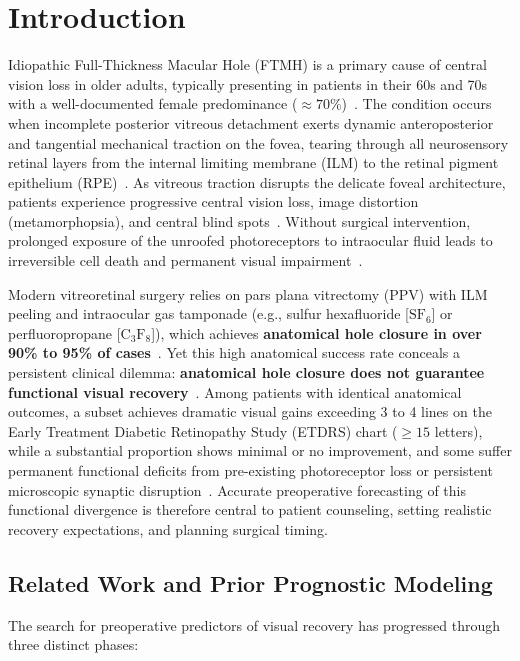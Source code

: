 \documentclass[preprint,12pt]{elsarticle}
\begin{document}
\section{Introduction}

Idiopathic Full-Thickness Macular Hole (FTMH) is a primary cause of central vision loss in older adults, typically presenting in patients in their 60s and 70s with a well-documented female predominance ($\approx 70\%$)~\cite{kelly1991}. The condition occurs when incomplete posterior vitreous detachment exerts dynamic anteroposterior and tangential mechanical traction on the fovea, tearing through all neurosensory retinal layers from the internal limiting membrane (ILM) to the retinal pigment epithelium (RPE)~\cite{gass1995, duker2013, kusuhara2004}. As vitreous traction disrupts the delicate foveal architecture, patients experience progressive central vision loss, image distortion (metamorphopsia), and central blind spots~\cite{michalewska2010}. Without surgical intervention, prolonged exposure of the unroofed photoreceptors to intraocular fluid leads to irreversible cell death and permanent visual impairment~\cite{wakabayashi2010}.

Modern vitreoretinal surgery relies on pars plana vitrectomy (PPV) with ILM peeling and intraocular gas tamponade (e.g., sulfur hexafluoride [$\text{SF}_6$] or perfluoropropane [$\text{C}_3\text{F}_8$]), which achieves \textbf{anatomical hole closure in over 90\% to 95\% of cases}~\cite{kelly1991, brooks2000}. Yet this high anatomical success rate conceals a persistent clinical dilemma: \textbf{anatomical hole closure does not guarantee functional visual recovery}~\cite{baumann2021}. Among patients with identical anatomical outcomes, a subset achieves dramatic visual gains exceeding 3 to 4 lines on the Early Treatment Diabetic Retinopathy Study (ETDRS) chart ($\ge 15$ letters), while a substantial proportion shows minimal or no improvement, and some suffer permanent functional deficits from pre-existing photoreceptor loss or persistent microscopic synaptic disruption~\cite{wakabayashi2010, bottoni2011}. Accurate preoperative forecasting of this functional divergence is therefore central to patient counseling, setting realistic recovery expectations, and planning surgical timing.

\subsection{Related Work and Prior Prognostic Modeling}
The search for preoperative predictors of visual recovery has progressed through three distinct phases:
\end{document}
